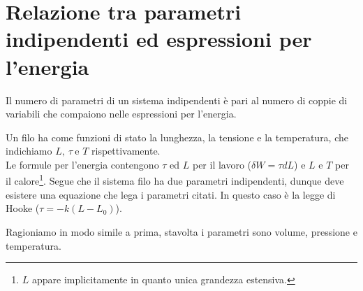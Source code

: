 \section{Relazione tra parametri indipendenti ed espressioni per l'energia}

\begin{fact}
Il numero di parametri di un sistema indipendenti \`e pari al numero di coppie di variabili che compaiono nelle espressioni per l'energia.
\end{fact}

\begin{example}[Filo]
Un filo ha come funzioni di stato la lunghezza, la tensione e la temperatura, che indichiamo $L,\ \tau\ \text{e }T$ rispettivamente.\\
Le formule per l'energia contengono $\tau$ ed $L$ per il lavoro ($\delta W=\tau dL$) e $L$ e $T$ per il calore\footnote{$L$ appare implicitamente in quanto unica grandezza estensiva.}. Segue che il sistema filo ha due parametri indipendenti, dunque deve esistere una equazione che lega i parametri citati. In questo caso \`e la legge di Hooke ($\tau=-k(L-L_0)$).
\end{example}

\begin{example}[Fluidi]
Ragioniamo in modo simile a prima, stavolta i parametri sono volume, pressione e temperatura.
\end{example}